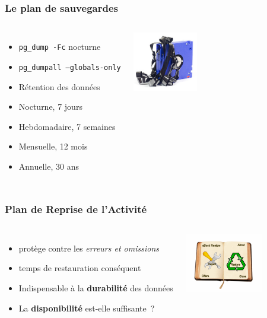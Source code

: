 \documentclass[english]{beamer}
\begin{document}
\begin{frame}[fragile]
  \frametitle{Le plan de sauvegardes}


\begin{columns}[c]

  \begin{itemize}
   \item<1-> \texttt{pg\_dump -Fc} nocturne
   \item<1-> \texttt{pg\_dumpall --globals-only}
   \item<2-> Rétention des données
   \item<2-> Nocturne, 7 jours
   \item<2-> Hebdomadaire, 7 semaines
   \item<2-> Mensuelle, 12 mois
   \item<3-> Annuelle, 30 ans
  \end{itemize}  

\includegraphics[height=7em]{online-backup.jpg}
\end{columns}
\end{frame}

\begin{frame}[fragile]
  \frametitle{Plan de Reprise de l'Activité}

  \linebreak
  \linebreak

\begin{columns}[c]

  \begin{itemize}
    \item<1-> protège contre les \textit{erreurs et omissions}
    \item<1-> temps de restauration conséquent
    \item<2-> Indispensable à la \textbf{durabilité} des données
    \item<2-> La \textbf{disponibilité} est-elle suffisante ?
  \end{itemize}

\includegraphics[height=7em]{restore.png}
\end{columns}
\end{frame}
\end{document}
